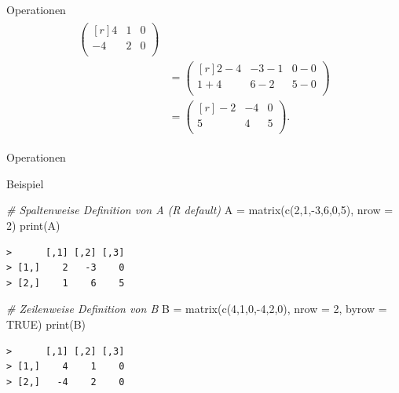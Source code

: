 \documentclass[
  8pt,
  ignorenonframetext,
]{beamer}
\newenvironment{Shaded}{\begin{snugshade}}{\end{snugshade}}
\newcommand{\AttributeTok}[1]{\textcolor[rgb]{0.77,0.63,0.00}{#1}}
\newcommand{\CommentTok}[1]{\textcolor[rgb]{0.56,0.35,0.01}{\textit{#1}}}
\newcommand{\ConstantTok}[1]{\textcolor[rgb]{0.00,0.00,0.00}{#1}}
\newcommand{\DecValTok}[1]{\textcolor[rgb]{0.00,0.00,0.81}{#1}}
\newcommand{\FunctionTok}[1]{\textcolor[rgb]{0.00,0.00,0.00}{#1}}
\newcommand{\NormalTok}[1]{#1}
\newcommand{\OtherTok}[1]{\textcolor[rgb]{0.56,0.35,0.01}{#1}}
\newcommand{\SpecialCharTok}[1]{\textcolor[rgb]{0.00,0.00,0.00}{#1}}
\begin{document}
\begin{frame}{Operationen}
\begin{align}
\begin{split}
\begin{pmatrix*}[r]
 4 & 1 & 0\\
-4 & 2 & 0\\
\end{pmatrix*}\\
& =
\begin{pmatrix*}[r]
2 - 4 & -3 - 1 & 0 - 0\\
1 + 4 &  6 - 2 & 5 - 0\\
\end{pmatrix*}\\
& =
\begin{pmatrix*}[r]
-2 & -4 & 0\\
5 &  4 & 5 \\
\end{pmatrix*}.
\end{split}
\end{align}
\end{frame}

\begin{frame}[fragile]{Operationen}
\protect\hypertarget{operationen-4}{}
\small

Beispiel \vspace{5mm}

\footnotesize

\begin{Shaded}
\begin{Highlighting}[]
\CommentTok{\# Spaltenweise Definition von A (R default)}
\NormalTok{A }\OtherTok{=} \FunctionTok{matrix}\NormalTok{(}\FunctionTok{c}\NormalTok{(}\DecValTok{2}\NormalTok{,}\DecValTok{1}\NormalTok{,}\SpecialCharTok{{-}}\DecValTok{3}\NormalTok{,}\DecValTok{6}\NormalTok{,}\DecValTok{0}\NormalTok{,}\DecValTok{5}\NormalTok{), }\AttributeTok{nrow =} \DecValTok{2}\NormalTok{)}
\FunctionTok{print}\NormalTok{(A)}
\end{Highlighting}
\end{Shaded}

\begin{verbatim}
>      [,1] [,2] [,3]
> [1,]    2   -3    0
> [2,]    1    6    5
\end{verbatim}

\vspace{5mm}

\begin{Shaded}
\begin{Highlighting}[]
\CommentTok{\# Zeilenweise Definition von B}
\NormalTok{B }\OtherTok{=} \FunctionTok{matrix}\NormalTok{(}\FunctionTok{c}\NormalTok{(}\DecValTok{4}\NormalTok{,}\DecValTok{1}\NormalTok{,}\DecValTok{0}\NormalTok{,}\SpecialCharTok{{-}}\DecValTok{4}\NormalTok{,}\DecValTok{2}\NormalTok{,}\DecValTok{0}\NormalTok{), }\AttributeTok{nrow =} \DecValTok{2}\NormalTok{, }\AttributeTok{byrow =} \ConstantTok{TRUE}\NormalTok{)}
\FunctionTok{print}\NormalTok{(B)}
\end{Highlighting}
\end{Shaded}

\begin{verbatim}
>      [,1] [,2] [,3]
> [1,]    4    1    0
> [2,]   -4    2    0
\end{verbatim}
\end{frame}
\end{document}
